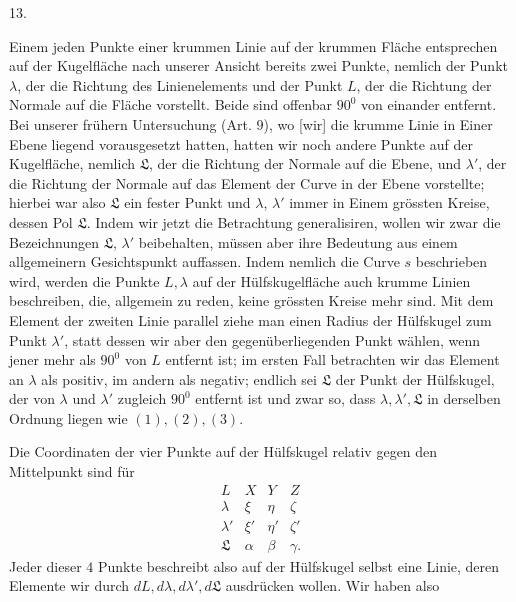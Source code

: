 %
\begin{center}13.\end{center}
\noindent\hspace*{1.2em}Einem jeden Punkte einer krummen Linie auf der krummen Fläche entsprechen auf der Kugelfläche nach unserer Ansicht bereits zwei Punkte, nemlich der Punkt $\lambda$, der die Richtung des Linienelements und der Punkt $L$, der die Richtung der Normale auf die Fläche vorstellt. Beide sind offenbar $90^{0}$ von einander entfernt. Bei unserer frühern Untersuchung (Art. $9$), wo [wir] die krumme Linie in Einer Ebene liegend vorausgesetzt hatten, hatten wir noch  andere Punkte auf der Kugelfläche, nemlich $\mathfrak{L}$, der die Richtung der Normale auf die Ebene, und $\lambda'$, der die Richtung der Normale auf das Element der Curve in der Ebene vorstellte; hierbei war also $\mathfrak{L}$ ein fester Punkt und $\lambda$, $\lambda'$ immer in Einem grössten Kreise, dessen Pol $\mathfrak{L}$. Indem wir jetzt die Betrachtung generalisiren, wollen wir zwar die Bezeichnungen $\mathfrak{L}$, $\lambda'$ beibehalten, müssen aber ihre Bedeutung aus einem allgemeinern Gesichtspunkt auffassen. Indem nemlich die Curve $s$ beschrieben wird, werden die Punkte $L,\lambda$ auf der Hülfskugelfläche auch krumme Linien beschreiben, die, allgemein zu reden, keine grössten Kreise mehr sind. Mit dem Element der zweiten Linie parallel ziehe man einen Radius der Hülfskugel zum Punkt $\lambda'$, statt dessen wir aber den gegenüberliegenden Punkt wählen, wenn jener mehr als $90^{0}$ von $L$ entfernt ist; im ersten Fall betrachten wir das Element an $\lambda$ als positiv, im andern als negativ; endlich sei $\mathfrak{L}$ der Punkt der Hülfskugel, der von $\lambda$ und $\lambda'$ zugleich $90^{0}$ entfernt ist und zwar so, dass $\lambda,\lambda',\mathfrak{L}$ in derselben Ordnung liegen wie $(1),(2),(3)$.

Die Coordinaten der vier Punkte auf der Hülfskugel relativ gegen den Mittelpunkt sind für
\[
\begin{array}{cccc}
L&X&Y&Z\\
\lambda&\xi&\eta&\zeta\\
\lambda'&\xi'&\eta'&\zeta'\\
\mathfrak{L}&\alpha&\beta&\gamma.
\end{array}
\]
Jeder dieser $4$ Punkte beschreibt also auf der Hülfskugel selbst eine Linie, deren Elemente wir durch $dL,d\lambda,d\lambda',d\mathfrak{L}$ ausdrücken wollen. Wir haben also
